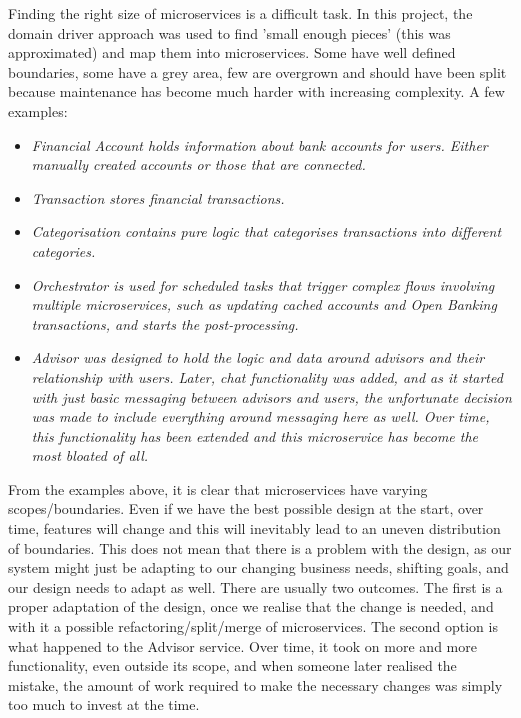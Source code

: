Finding the right size of microservices is a difficult task. In this project, the domain driver approach was used to find 'small enough pieces' (this was approximated) and map them into microservices. Some have well defined boundaries, some have a grey area, few are overgrown and should have been split because maintenance has become much harder with increasing complexity. A few examples:

\begin{itemize}
    \item \it{Financial Account} holds information about bank accounts for users. Either manually created accounts or those that are connected.
    \item \it{Transaction} stores financial transactions.
    \item \it{Categorisation} contains pure logic that categorises transactions into different categories.
    \item \it{Orchestrator} is used for scheduled tasks that trigger complex flows involving multiple microservices, such as updating cached accounts and Open Banking transactions, and starts the post-processing.
    \item \it{Advisor} was designed to hold the logic and data around advisors and their relationship with users. Later, chat functionality was added, and as it started with just basic messaging between advisors and users, the unfortunate decision was made to include everything around messaging here as well. Over time, this functionality has been extended and this microservice has become the most bloated of all.
\end{itemize}

From the examples above, it is clear that microservices have varying scopes/boundaries. Even if we have the best possible design at the start, over time, features will change and this will inevitably lead to an uneven distribution of boundaries. This does not mean that there is a problem with the design, as our system might just be adapting to our changing business needs, shifting goals, and our design needs to adapt as well. There are usually two outcomes. The first is a proper adaptation of the design, once we realise that the change is needed, and with it a possible refactoring/split/merge of microservices. The second option is what happened to the Advisor service. Over time, it took on more and more functionality, even outside its scope, and when someone later realised the mistake, the amount of work required to make the necessary changes was simply too much to invest at the time.

